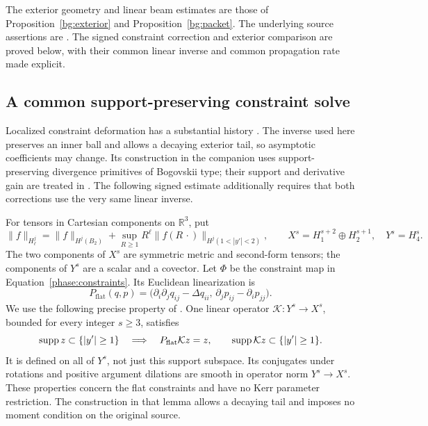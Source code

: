 The exterior geometry and linear beam estimates are
those of Proposition~\ref{bg:exterior} and
Proposition~\ref{bg:packet}.  The underlying source assertions are
\cite[, , and ]{Foundation}.
The signed constraint correction and exterior comparison are proved below,
with their common linear inverse and common propagation rate made explicit.

\subsection{A common support-preserving constraint solve}

Localized constraint deformation has a substantial history
\cite{Corvino2000,CorvinoSchoen2006,ChruscielDelay2003,CarlottoSchoen2016}.
The inverse used here preserves an inner ball and allows a decaying
exterior tail, so asymptotic coefficients may change. Its construction
in the companion uses support-preserving divergence primitives of
Bogovskii type; their support and derivative gain are treated in
\cite{CostabelMcIntosh2010}. The following signed estimate additionally
requires that both corrections use the very same linear inverse.

For tensors in Cartesian components on $\mathbb R^3$, put
\begin{equation}\label{prep:weighted-spaces}
 \|f\|_{H^j_\ell}
 =\|f\|_{H^j(B_2)}+
   \sup_{R\ge1}R^\ell\|f(R\,\cdot)\|_{H^j(1<|y'|<2)},
 \qquad
 X^s=H^{s+2}_1\oplus H^{s+1}_2,\quad Y^s=H^s_4.
\end{equation}
The two components of $X^s$ are symmetric metric and second-form
tensors; the components of $Y^s$ are a scalar and a covector.
Let $\Phi$ be the constraint map in Equation~\eqref{phase:constraints}.
Its Euclidean linearization is
\begin{equation}\label{prep:flat-linearization}
 P_{\mathrm{flat}}(q,p)=
 \bigl(\partial_i\partial_jq_{ij}-\Delta q_{ii},\,
       \partial_jp_{ij}-\partial_i p_{jj}\bigr).
\end{equation}
We use the following precise property of
\cite[]{Foundation}.  One linear operator
$\mathcal K:Y^s\to X^s$, bounded for every integer $s\ge3$, satisfies
\begin{equation}\label{prep:right-inverse}
 \operatorname{supp} z\subset\{|y'|\ge1\}\quad\Longrightarrow\quad
 P_{\mathrm{flat}}\mathcal Kz=z,\qquad
 \operatorname{supp}\mathcal Kz\subset\{|y'|\ge1\}.
\end{equation}
It is defined on all of $Y^s$, not just this support subspace.
Its conjugates under rotations and positive argument dilations are
smooth in operator norm $Y^s\to X^s$.  These properties concern the
flat constraints and have no Kerr parameter restriction.  The
construction in that lemma allows a decaying tail and imposes no
moment condition on the original source.

